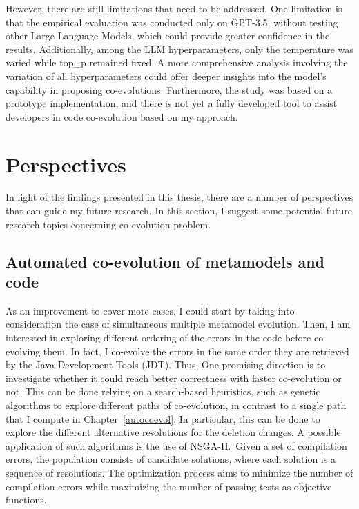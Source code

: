 However, there are still limitations that need to be addressed. One limitation is that the empirical evaluation was conducted only on GPT-3.5, without testing other Large Language Models, which could provide greater confidence in the results. Additionally, among the LLM hyperparameters, only the temperature was varied while top\_p remained fixed. A more comprehensive analysis involving the variation of all hyperparameters could offer deeper insights into the model's capability in proposing co-evolutions. Furthermore, the study was based on a prototype implementation, and there is not yet a fully developed tool to assist developers in code co-evolution based on my approach.
\section{Perspectives}
In light of the findings presented in this thesis, there are a number of perspectives that can guide my future research. In this section, I suggest some potential future research topics concerning co-evolution problem.

\subsection{Automated co-evolution of metamodels and code}

As an improvement to cover more cases, I could start by taking into consideration the case of simultaneous multiple metamodel evolution. 
Then, I am interested in exploring different ordering of the errors in the code before co-evolving them. In fact, I co-evolve the errors in the same order they are retrieved by the Java Development Tools (JDT). Thus, One promising direction is to investigate whether it could reach better correctness with faster co-evolution or not. 
This can be done relying on a search-based heuristics, such as genetic algorithms to explore different paths of co-evolution, in contrast to a single path that I compute in Chapter~\ref{autocoevol}. In particular, this can be done to explore the different alternative resolutions for the deletion changes. A possible application of such algorithms is the use of NSGA-II.~Given a set of compilation errors, the population consists of candidate solutions, where each solution is a sequence of resolutions. The optimization process aims to minimize the number of compilation errors while maximizing the number of passing tests as objective functions.

